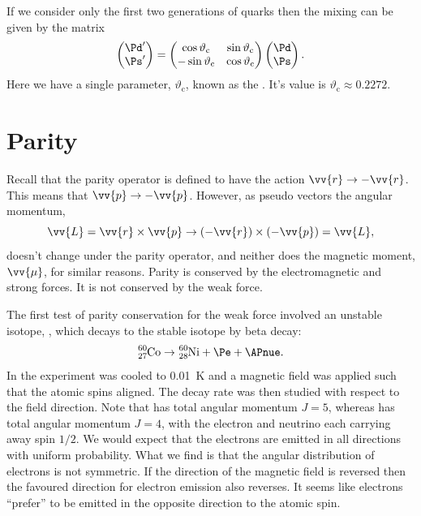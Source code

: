 \documentclass[fleqn]{NotesClass}
\begin{document}
    If we consider only the first two generations of quarks then the mixing can be given by the matrix
    \begin{equation}
        \begin{pmatrix}
            \Pd' \\ \Ps'
        \end{pmatrix}
        =
        \begin{pmatrix}
            \cos\vartheta_{\mathrm{c}} & \sin\vartheta_{\mathrm{c}}\\
            -\sin\vartheta_{\mathrm{c}} & \cos\vartheta_{\mathrm{c}}
        \end{pmatrix}
        \begin{pmatrix}
            \Pd \\ \Ps
        \end{pmatrix}
        .
    \end{equation}
    Here we have a single parameter, \(\vartheta_{\mathrm{c}}\), known as the .
    It's value is \(\vartheta_{\mathrm{c}} \approx 0.2272\).
    
    \section{Parity}
    Recall that the parity operator is defined to have the action \(\vv{r} \to -\vv{r}\).
    This means that \(\vv{p} \to -\vv{p}\).
    However, as pseudo vectors the angular momentum,
    \begin{equation}
        \vv{L} = \vv{r} \times \vv{p} \to (-\vv{r})\times (-\vv{p}) = \vv{L},
    \end{equation}
    doesn't change under the parity operator, and neither does the magnetic moment, \(\vv{\mu}\), for similar reasons.
    Parity is conserved by the electromagnetic and strong forces.
    It is not conserved by the weak force.
    
    The first test of parity conservation for the weak force involved an unstable isotope, , which decays to the stable isotope  by beta decay:
    \begin{equation}
        \ce{^60_27Co} \to \ce{^60_28Ni} + \Pe + \APnue.
    \end{equation}
    In the experiment  was cooled to \qty{0.01}{\kelvin} and a magnetic field was applied such that the atomic spins aligned.
    The decay rate was then studied with respect to the field direction.
    Note that  has total angular momentum \(J = 5\), whereas  has total angular momentum \(J = 4\), with the electron and neutrino each carrying away spin \(1/2\).
    We would expect that the electrons are emitted in all directions with uniform probability.
    What we find is that the angular distribution of electrons is not symmetric.
    If the direction of the magnetic field is reversed then the favoured direction for electron emission also reverses.
    It seems like electrons \enquote{prefer} to be emitted in the opposite direction to the atomic spin.
    
\end{document}
